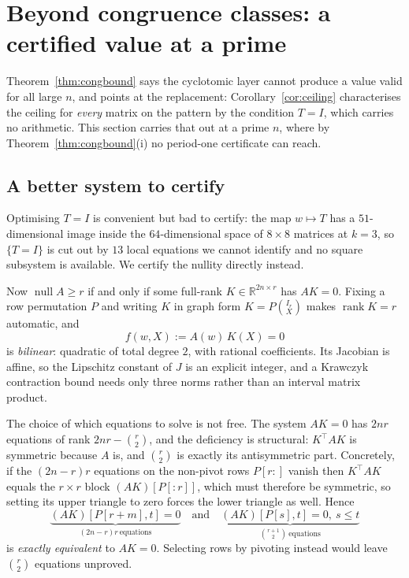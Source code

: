 \documentclass[11pt]{article}
\theoremstyle{definition}
\begin{document}
\section{Beyond congruence classes: a certified value at a prime}
\label{sec:generaln}
Theorem~\ref{thm:congbound} says the cyclotomic layer cannot produce a value
valid for all large $n$, and points at the replacement:
Corollary~\ref{cor:ceiling} characterises the ceiling for \emph{every} matrix on
the pattern by the condition $T=I$, which carries no arithmetic. This section
carries that out at a prime $n$, where by Theorem~\ref{thm:congbound}(i) no
period-one certificate can reach.

\subsection*{A better system to certify}
Optimising $T=I$ is convenient but bad to certify: the map $w\mapsto T$ has a
$51$-dimensional image inside the $64$-dimensional space of $8\times8$ matrices
at $k=3$, so $\{T=I\}$ is cut out by $13$ local equations we cannot identify and
no square subsystem is available. We certify the nullity directly instead.

Now $\operatorname{null}A\ge r$ if and only if some full-rank $K\in
\mathbb R^{2n\times r}$ has $AK=0$. Fixing a row permutation $P$ and writing $K$
in graph form $K=P\binom{I_r}{X}$ makes $\operatorname{rank}K=r$ automatic, and
\[
  f(w,X):=A(w)\,K(X)=0
\]
is \emph{bilinear}: quadratic of total degree $2$, with rational coefficients.
Its Jacobian is affine, so the Lipschitz constant of $J$ is an explicit integer,
and a Krawczyk contraction bound needs only three norms rather than an interval
matrix product.

The choice of which equations to solve is not free. The system $AK=0$ has
$2nr$ equations of rank $2nr-\binom r2$, and the deficiency is structural:
$K^{\!\top}\!AK$ is symmetric because $A$ is, and $\binom r2$ is exactly its
antisymmetric part. Concretely, if the $(2n-r)r$ equations on the non-pivot rows
$P[r{:}]$ vanish then $K^{\!\top}\!AK$ equals the $r\times r$ block
$(AK)[P[{:}r]]$, which must therefore be symmetric, so setting its upper
triangle to zero forces the lower triangle as well. Hence
\[
  \underbrace{(AK)[P[r+m],t]=0}_{(2n-r)r\ \text{equations}}
  \quad\text{and}\quad
  \underbrace{(AK)[P[s],t]=0,\ s\le t}_{\binom{r+1}2\ \text{equations}}
\]
is \emph{exactly equivalent} to $AK=0$. Selecting rows by pivoting instead would
leave $\binom r2$ equations unproved.
\end{document}
